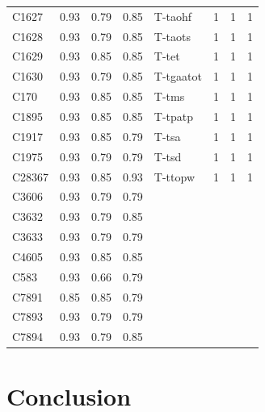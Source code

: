 \documentclass[a4paper,10pt,twoside,fleqn]{article}
\begin{document}
\begin{table}
\begin{tabular}{lrrrlrrr}
C1627    & 0.93 & 0.79 & 0.85 &    T-taohf    &    1    &    1    &    1   \\
C1628    & 0.93 & 0.79 & 0.85 &    T-taots    &    1    &    1    &    1   \\
C1629    & 0.93 & 0.85 & 0.85 &      T-tet    &    1    &    1    &    1   \\
C1630    & 0.93 & 0.79 & 0.85 &  T-tgaatot    &    1    &    1    &    1   \\
C170     & 0.93 & 0.85 & 0.85 &      T-tms    &    1    &    1    &    1   \\
C1895    & 0.93 & 0.85 & 0.85 &    T-tpatp    &    1    &    1    &    1   \\
C1917    & 0.93 & 0.85 & 0.79 &      T-tsa    &    1    &    1    &    1   \\
C1975    & 0.93 & 0.79 & 0.79 &      T-tsd    &    1    &    1    &    1   \\
C28367   & 0.93 & 0.85 & 0.93 &    T-ttopw    &    1    &    1    &    1   \\
C3606    & 0.93 & 0.79 & 0.79 &             &         &         & 		\\
C3632    & 0.93 & 0.79 & 0.85 &             &         &         & 		\\
C3633    & 0.93 & 0.79 & 0.79 &             &         &         & 		\\
C4605    & 0.93 & 0.85 & 0.85 &             &         &         & 		\\
C583     & 0.93 & 0.66 & 0.79 &             &         &         & 		\\
C7891    & 0.85 & 0.85 & 0.79 &             &         &         & 		\\
C7893    & 0.93 & 0.79 & 0.79 &             &         &         & 		\\
C7894    & 0.93 & 0.79 & 0.85 &             &         &         & 		\\
\bottomrule
\end{tabular}
\end{table}










\section{Conclusion}\label{sec:conclusion}
\end{document}
